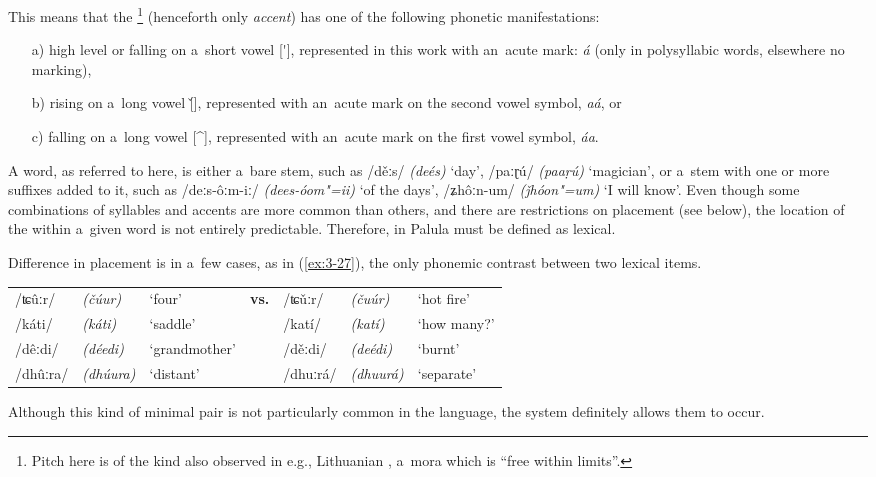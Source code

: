 This means that the \footnote{Pitch  here is of the kind also observed in e.g., Lithuanian \citep[73--82]{szemerenyi1996}, a~mora  which is ``free within limits''.} (henceforth only \textit{accent}) has one of the following phonetic manifestations:
\begin{enumerate}
\item[a)] high level or falling on a~short vowel [\'{}], represented in this work with an~acute  mark: \textit{á} (only in polysyllabic words, elsewhere no marking), 
\item[b)] rising on a~long vowel [\v{}], represented with an~acute  mark on the second vowel symbol, \textit{aá}, or 
\item[c)] falling on a~long vowel [\^{}], represented with an~acute  mark on the first vowel symbol, \textit{áa}.
\end{enumerate}
A word, as referred to here, is either a~bare stem, such as /děːs/ \textit{(deés)} `day', /paːɽú/ \textit{(paaṛú)} `magician', or a~stem with one or more suffixes added to it, such as /deːs-ôːm-iː/ \textit{(dees-óom"=ii)} `of the days', /ʑhôːn-um/ \textit{(ǰhóon"=um)} `I will know'. Even though some combinations of syllables and accents are more common than others, and there are restrictions on  placement (see below), the location of the  within a~given word is not entirely predictable. Therefore,  in Palula must be defined as lexical. 


Difference in  placement is in a~few cases, as in (\ref{ex:3-27}), the only phonemic contrast between two lexical items.


\begin{exe}
\extab
\label{ex:3-27}
\begin{tabularx}{116mm}{ l l Q l l l Q }
/ʨûːr/ &
\textit{(čúur)} &
`four' &
\textbf{vs.} &
/ʨǔːr/ &
\textit{(čuúr)} &
`hot fire'\\
/káti/ &
\textit{(káti)} &
`saddle' &
&
/katí/ &
\textit{(katí)} &
`how many?'\\
/dêːdi/ &
\textit{(déedi)} &
`grand\-mother' &
&
/děːdi/ &
\textit{(deédi)} &
`burnt'\\
/dhûːra/ &
\textit{(dhúura)} &
`distant' &
&
/dhuːrá/ &
\textit{(dhuurá)} &
`separate'\\
\end{tabularx}
\end{exe}

Although this kind of minimal pair is not particularly common in the language, the system definitely allows them to occur.

